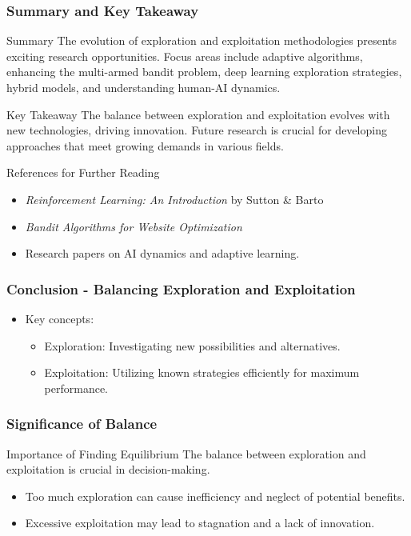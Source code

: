 \documentclass[aspectratio=169]{beamer}
\begin{document}
\begin{frame}[fragile]
    \frametitle{Summary and Key Takeaway}
    \begin{block}{Summary}
        The evolution of exploration and exploitation methodologies presents exciting research opportunities. Focus areas include adaptive algorithms, enhancing the multi-armed bandit problem, deep learning exploration strategies, hybrid models, and understanding human-AI dynamics.
    \end{block}

    \begin{block}{Key Takeaway}
        The balance between exploration and exploitation evolves with new technologies, driving innovation. Future research is crucial for developing approaches that meet growing demands in various fields.
    \end{block}

    \begin{block}{References for Further Reading}
        \begin{itemize}
            \item \textit{Reinforcement Learning: An Introduction} by Sutton \& Barto
            \item \textit{Bandit Algorithms for Website Optimization}
            \item Research papers on AI dynamics and adaptive learning.
        \end{itemize}
    \end{block}
\end{frame}

\begin{frame}[fragile]
    \frametitle{Conclusion - Balancing Exploration and Exploitation}
    \begin{itemize}
        \item Key concepts:
        \begin{itemize}
            \item Exploration: Investigating new possibilities and alternatives.
            \item Exploitation: Utilizing known strategies efficiently for maximum performance.
        \end{itemize}
    \end{itemize}
\end{frame}

\begin{frame}[fragile]
    \frametitle{Significance of Balance}
    \begin{block}{Importance of Finding Equilibrium}
        The balance between exploration and exploitation is crucial in decision-making. 
        \begin{itemize}
            \item Too much exploration can cause inefficiency and neglect of potential benefits.
            \item Excessive exploitation may lead to stagnation and a lack of innovation.
        \end{itemize}
    \end{block}
\end{frame}
\end{document}
